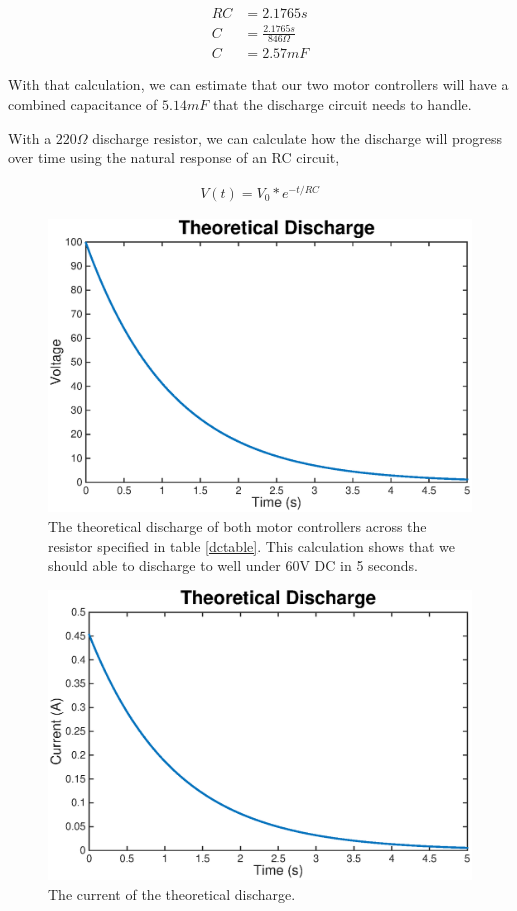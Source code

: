 \documentclass{article}
\begin{document}
            \begin{align}
                RC &= 2.1765 s\\
                C &= \frac{2.1765 s}{846 \Omega}\\
                C &= 2.57 mF
            \end{align}

            With that calculation, we can estimate that our two motor controllers will have a combined capacitance of $5.14 mF$ that the discharge circuit needs to handle.

            With a $220 \Omega$ discharge resistor, we can calculate how the discharge will progress over time using the natural response of an RC circuit,

            \begin{align}
                V(t) = V_{0} * e^{-t/RC}
            \end{align}

            \begin{figure}[H]
                \centering
                \includegraphics[width = 0.8  \textwidth]{voltage.eps}
                \caption{The theoretical discharge of both motor controllers across the resistor specified in table \ref{dctable}. This calculation shows that we should able to discharge to well under 60V DC in 5 seconds.  }
                \label{discharge_volts}
            \end{figure}

            \begin{figure}[H]
                \centering
                \includegraphics[width = 0.8  \textwidth]{current.eps}
                \caption{The current of the theoretical discharge.}
                \label{discharge_amps}
            \end{figure}
\end{document}

